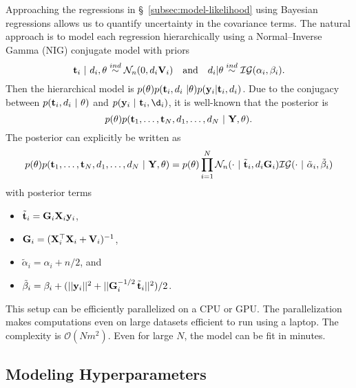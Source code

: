 \documentclass[letterpaper]{article}
\begin{document}
  Approaching the regressions in \S~\ref{subsec:model-likelihood} using Bayesian
  regressions allows us to quantify uncertainty in the covariance terms. The natural
  approach is to model each regression hierarchically using a Normal--Inverse Gamma
  (NIG) conjugate model with priors
  \begin{equation*}
    \mathbf{t}_{i}\ |\ d_{i}, \theta \overset{ind}{\sim} \mathcal{N}_{n}(0, d_{i}\mathbf{V}_{i})
    \quad\text{and}\quad
    d_{i} | \theta \overset{ind}{\sim} \mathcal{IG}(\alpha_{i}, \beta_{i}).
  \end{equation*}
  Then the hierarchical model is
  $p(\theta)p(\mathbf{t}_{i}, d_{i}\ | \theta)p(\mathbf{y}_{i} | \mathbf{t}_{i}, d_{i})$. Due to the
  conjugacy between $p(\mathbf{t}_{i}, d_{i}\ |\ \theta)$ and $p(\by_{i}\ |\ \bt_{i}, \d_{i})$,
  it is well-known that the posterior is
  \begin{equation}
    p(\theta)p(\mathbf{t}_{1}, \dots, \mathbf{t}_{N}, d_{1}, \dots, d_{N}\ |\ \mathbf{Y}, \theta).
    \label{eqn:posterior-distribution}
  \end{equation}
  The posterior can explicitly be written as
  \begin{equation}
    p(\theta)p(\mathbf{t}_{1}, \dots, \mathbf{t}_{N}, d_{1}, \dots, d_{N}\ |\ \mathbf{Y}, \theta) =
    p(\theta)\prod_{i=1}^{N}
    \mathcal{N}_{n}(\cdot\ |\ \tilde{\mathbf{t}}_{i}, d_{i}\mathbf{G}_{i})
    \mathcal{IG}(\cdot\ |\ \tilde{\alpha}_{i}, \tilde{\beta}_{i})
    \label{eqn:posterior-terms}
  \end{equation}
  with posterior terms
  \begin{itemize}
    \item $\tilde{\mathbf{t}}_{i} = \mathbf{G}_{i}\mathbf{X}_{i}\mathbf{y}_{i}$,
    \item $\mathbf{G}_{i} = (\mathbf{X}_{i}^{\top}\mathbf{X}_{i} + \mathbf{V}_{i})^{-1}$,
    \item $\tilde{\alpha}_{i} = \alpha_{i} + n/2$, and
    \item $\tilde{\beta}_{i} = \beta_{i} + (||\mathbf{y}_{i}||^{2} + ||\mathbf{G}_{i}^{-1/2}\,\tilde{\mathbf{t}}_{i}||^{2})/2$.
  \end{itemize}

  This setup can be efficiently parallelized on a CPU or GPU. The parallelization
  makes computations even on large datasets efficient to run using a laptop. The
  complexity is $\mathcal{O}(Nm^2)$. Even for large $N$, the model can be fit
  in minutes.
    
  \subsection{Modeling Hyperparameters}\label{subsec:hyperparameters}
\end{document}
